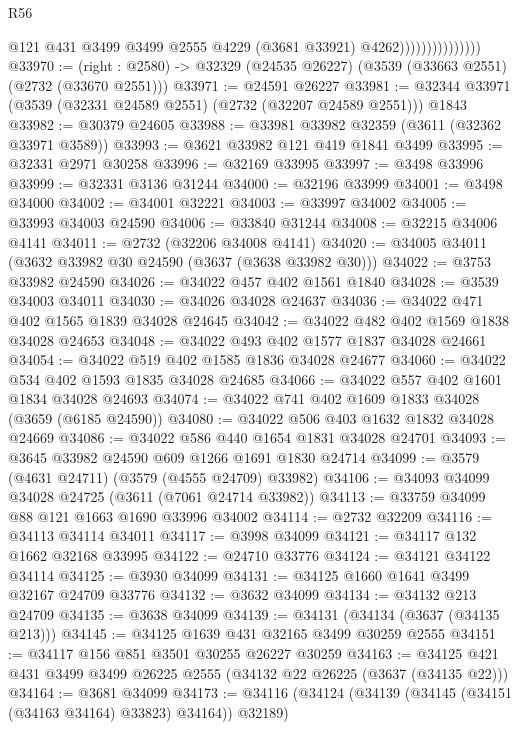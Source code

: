 \begin{lexlean}{R56}
\begin{coremodule}
                                  @121
                                  @431
                                  @3499
                                  @3499
                                  @2555
                                  @4229
                                  (@3681 @33921)
                                  @4262)))))))))))))))
@33970 := (right : @2580) -> @32329 (@24535 @26227) (@3539 (@33663 @2551) (@2732 (@33670 @2551)))
@33971 := @24591 @26227
@33981 := @32344 @33971 (@3539 (@32331 @24589 @2551) (@2732 (@32207 @24589 @2551))) @1843
@33982 := @30379 @24605
@33988 := @33981 @33982 @32359 (@3611 (@32362 @33971 @3589))
@33993 := @3621 @33982 @121 @419 @1841 @3499
@33995 := @32331 @2971 @30258
@33996 := @32169 @33995
@33997 := @3498 @33996
@33999 := @32331 @3136 @31244
@34000 := @32196 @33999
@34001 := @3498 @34000
@34002 := @34001 @32221
@34003 := @33997 @34002
@34005 := @33993 @34003 @24590
@34006 := @33840 @31244
@34008 := @32215 @34006 @4141
@34011 := @2732 (@32206 @34008 @4141)
@34020 := @34005 @34011 (@3632 @33982 @30 @24590 (@3637 (@3638 @33982 @30)))
@34022 := @3753 @33982 @24590
@34026 := @34022 @457 @402 @1561 @1840
@34028 := @3539 @34003 @34011
@34030 := @34026 @34028 @24637
@34036 := @34022 @471 @402 @1565 @1839 @34028 @24645
@34042 := @34022 @482 @402 @1569 @1838 @34028 @24653
@34048 := @34022 @493 @402 @1577 @1837 @34028 @24661
@34054 := @34022 @519 @402 @1585 @1836 @34028 @24677
@34060 := @34022 @534 @402 @1593 @1835 @34028 @24685
@34066 := @34022 @557 @402 @1601 @1834 @34028 @24693
@34074 := @34022 @741 @402 @1609 @1833 @34028 (@3659 (@6185 @24590))
@34080 := @34022 @506 @403 @1632 @1832 @34028 @24669
@34086 := @34022 @586 @440 @1654 @1831 @34028 @24701
@34093 := @3645 @33982 @24590 @609 @1266 @1691 @1830 @24714
@34099 := @3579 (@4631 @24711) (@3579 (@4555 @24709) @33982)
@34106 := @34093 @34099 @34028 @24725 (@3611 (@7061 @24714 @33982))
@34113 := @33759 @34099 @88 @121 @1663 @1690 @33996 @34002
@34114 := @2732 @32209
@34116 := @34113 @34114 @34011
@34117 := @3998 @34099
@34121 := @34117 @132 @1662 @32168 @33995
@34122 := @24710 @33776
@34124 := @34121 @34122 @34114
@34125 := @3930 @34099
@34131 := @34125 @1660 @1641 @3499 @32167 @24709 @33776
@34132 := @3632 @34099
@34134 := @34132 @213 @24709
@34135 := @3638 @34099
@34139 := @34131 (@34134 (@3637 (@34135 @213)))
@34145 := @34125 @1639 @431 @32165 @3499 @30259 @2555
@34151 := @34117 @156 @851 @3501 @30255 @26227 @30259
@34163 := @34125 @421 @431 @3499 @3499 @26225 @2555 (@34132 @22 @26225 (@3637 (@34135 @22)))
@34164 := @3681 @34099
@34173 := @34116 (@34124 (@34139 (@34145 (@34151 (@34163 @34164) @33823) @34164)) @32189)

\end{coremodule}
\end{lexlean}
